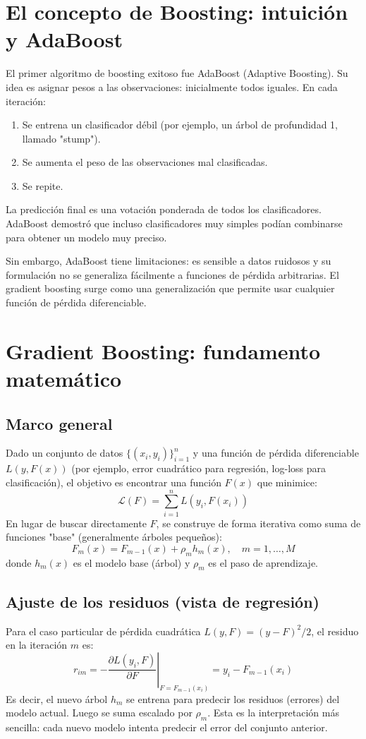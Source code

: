 \documentclass[12pt,a4paper,openany,oneside]{book}
\begin{document}
\section{El concepto de Boosting: intuición y AdaBoost}
El primer algoritmo de boosting exitoso fue AdaBoost (Adaptive Boosting). Su idea es asignar pesos a las observaciones: inicialmente todos iguales. En cada iteración:
\begin{enumerate}
    \item Se entrena un clasificador débil (por ejemplo, un árbol de profundidad 1, llamado "stump").
    \item Se aumenta el peso de las observaciones mal clasificadas.
    \item Se repite.
\end{enumerate}
La predicción final es una votación ponderada de todos los clasificadores. AdaBoost demostró que incluso clasificadores muy simples podían combinarse para obtener un modelo muy preciso.

Sin embargo, AdaBoost tiene limitaciones: es sensible a datos ruidosos y su formulación no se generaliza fácilmente a funciones de pérdida arbitrarias. El gradient boosting surge como una generalización que permite usar cualquier función de pérdida diferenciable.

\section{Gradient Boosting: fundamento matemático}

\subsection{Marco general}
Dado un conjunto de datos \(\{ (x_i, y_i) \}_{i=1}^n\) y una función de pérdida diferenciable \(L(y, F(x))\) (por ejemplo, error cuadrático para regresión, log-loss para clasificación), el objetivo es encontrar una función \(F(x)\) que minimice:
\[
\mathcal{L}(F) = \sum_{i=1}^n L(y_i, F(x_i))
\]
En lugar de buscar directamente \(F\), se construye de forma iterativa como suma de funciones "base" (generalmente árboles pequeños):
\[
F_m(x) = F_{m-1}(x) + \rho_m h_m(x), \quad m = 1, \dots, M
\]
donde \(h_m(x)\) es el modelo base (árbol) y \(\rho_m\) es el paso de aprendizaje.

\subsection{Ajuste de los residuos (vista de regresión)}
Para el caso particular de pérdida cuadrática \(L(y, F) = (y - F)^2 / 2\), el residuo en la iteración \(m\) es:
\[
r_{im} = -\left. \frac{\partial L(y_i, F)}{\partial F} \right|_{F=F_{m-1}(x_i)} = y_i - F_{m-1}(x_i)
\]
Es decir, el nuevo árbol \(h_m\) se entrena para predecir los residuos (errores) del modelo actual. Luego se suma escalado por \(\rho_m\). Esta es la interpretación más sencilla: cada nuevo modelo intenta predecir el error del conjunto anterior.
\end{document}

